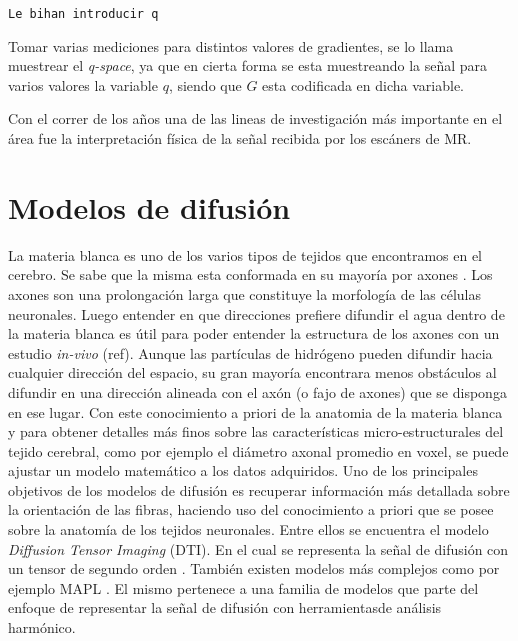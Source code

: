 \documentclass[11pt,a4paper,twoside]{tesis}
\begin{document}
\begin{verbatim}
Le bihan introducir q
\end{verbatim}




Tomar varias mediciones para distintos valores de gradientes, se lo llama 
muestrear el \textit{q-space}, ya que en cierta forma se esta 
muestreando la señal para varios valores la variable $q$, siendo que $G$ esta codificada en dicha 
variable.


Con el correr de los años una de las lineas de investigación más 
importante en el \'area fue la interpretaci\'on f\'isica de la se\~nal recibida 
por los escáners de MR.  



\section{Modelos de difusi\'on}
La materia blanca es uno de los varios tipos de tejidos que encontramos en el cerebro. Se sabe que 
la misma esta conformada en su mayor\'ia por axones \citep{Purves2004}. Los axones son una 
prolongaci\'on larga que constituye la morfolog\'ia de las c\'elulas neuronales. 
Luego entender en que direcciones prefiere difundir el agua dentro de la materia 
blanca es \'util para poder entender la estructura de los axones con un estudio \textit{in-vivo} 
(ref). Aunque las part\'iculas de hidr\'ogeno pueden difundir hacia cualquier 
direcci\'on del espacio, su gran mayor\'ia encontrara menos obst\'aculos al difundir en una 
direcci\'on alineada con el ax\'on (o fajo de axones) que se disponga en ese lugar. Con este 
conocimiento a priori de la anatomia de la materia blanca y para obtener detalles más finos sobre 
las características micro-estructurales del tejido cerebral, como por ejemplo el diámetro axonal 
promedio en voxel, se puede ajustar un modelo matemático a los datos adquiridos. Uno de los 
principales objetivos de los modelos de difusión es recuperar información más detallada sobre la 
orientación de las fibras, haciendo uso del conocimiento a priori que se posee sobre la anatomía de 
los tejidos neuronales. Entre ellos se encuentra el modelo \textit{Diffusion Tensor Imaging} (DTI). 
En el cual se representa la se\~nal de difusión con un tensor de segundo orden \citep{Basser1994}. 
También existen modelos más complejos como por ejemplo MAPL \citep{Fick2016365}. El mismo pertenece 
a una familia de modelos que parte del enfoque de representar la señal de difusión con 
herramientasde análisis harmónico.
\end{document}

